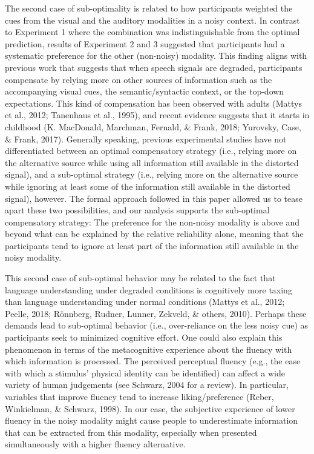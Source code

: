 \documentclass[english,floatsintext,man]{apa6}
\theoremstyle{definition}
\theoremstyle{definition}
\theoremstyle{definition}
\theoremstyle{remark}
\begin{document}
The second case of sub-optimality is related to how participants
weighted the cues from the visual and the auditory modalities in a noisy
context. In contrast to Experiment 1 where the combination was
indistinguishable from the optimal prediction, results of Experiment 2
and 3 suggested that participants had a systematic preference for the
other (non-noisy) modality. This finding aligns with previous work that
suggests that when speech signals are degraded, participants compensate
by relying more on other sources of information such as the accompanying
visual cues, the semantic/syntactic context, or the top-down
expectations. This kind of compensation has been observed with adults
(Mattys et al., 2012; Tanenhaus et al., 1995), and recent evidence
suggests that it starts in childhood (K. MacDonald, Marchman, Fernald,
\& Frank, 2018; Yurovsky, Case, \& Frank, 2017). Generally speaking,
previous experimental studies have not differentiated between an optimal
compensatory strategy (i.e., relying more on the alternative source
while using all information still available in the distorted signal),
and a sub-optimal strategy (i.e., relying more on the alternative source
while ignoring at least some of the information still available in the
distorted signal), however. The formal approach followed in this paper
allowed us to tease apart these two possibilities, and our analysis
supports the sub-optimal compensatory strategy: The preference for the
non-noisy modality is above and beyond what can be explained by the
relative reliability alone, meaning that the participants tend to ignore
at least part of the information still available in the noisy modality.

This second case of sub-optimal behavior may be related to the fact that
language understanding under degraded conditions is cognitively more
taxing than language understanding under normal conditions (Mattys et
al., 2012; Peelle, 2018; Rönnberg, Rudner, Lunner, Zekveld, \& others,
2010). Perhaps these demands lead to sub-optimal behavior (i.e.,
over-reliance on the less noisy cue) as participants seek to minimized
cognitive effort. One could also explain this phenomenon in terms of the
metacognitive experience about the fluency with which information is
processed. The perceived perceptual fluency (e.g., the ease with which a
stimulus' physical identity can be identified) can affect a wide variety
of human judgements (see Schwarz, 2004 for a review). In particular,
variables that improve fluency tend to increase liking/preference
(Reber, Winkielman, \& Schwarz, 1998). In our case, the subjective
experience of lower fluency in the noisy modality might cause people to
underestimate information that can be extracted from this modality,
especially when presented simultaneously with a higher fluency
alternative.
\end{document}
